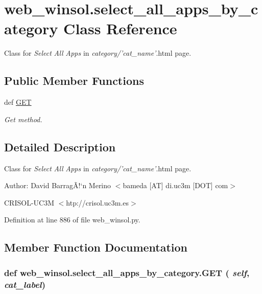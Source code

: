 \hypertarget{classweb__winsol_1_1select__all__apps__by__category}{
\section{web\_\-winsol.select\_\-all\_\-apps\_\-by\_\-category Class Reference}
\label{classweb__winsol_1_1select__all__apps__by__category}
}
Class for {\em Select\/} {\em All\/} {\em Apps\/} in {\em category/'cat\_\-name'\/}.html page.  


\subsection*{Public Member Functions}
\begin{CompactItemize}
\item 
def \hyperlink{classweb__winsol_1_1select__all__apps__by__category_27c6a7c9cacaacad2c5ce4ede8663be0}{GET}
\begin{CompactList}\small\item\em Get method. \item\end{CompactList}\end{CompactItemize}


\subsection{Detailed Description}
Class for {\em Select\/} {\em All\/} {\em Apps\/} in {\em category/'cat\_\-name'\/}.html page. 

\begin{Desc}
\item[Author:]David Barrag\~{A}!`n Merino $<$bameda \mbox{[}AT\mbox{]} di.uc3m \mbox{[}DOT\mbox{]} com$>$ 

CRISOL-UC3M $<$htp://crisol.uc3m.es$>$ \end{Desc}




Definition at line 886 of file web\_\-winsol.py.

\subsection{Member Function Documentation}
\hypertarget{classweb__winsol_1_1select__all__apps__by__category_27c6a7c9cacaacad2c5ce4ede8663be0}{
\subsubsection[GET]{\setlength{\rightskip}{0pt plus 5cm}def web\_\-winsol.select\_\-all\_\-apps\_\-by\_\-category.GET ( {\em self},  {\em cat\_\-label})}}
\label{classweb__winsol_1_1select__all__apps__by__category_27c6a7c9cacaacad2c5ce4ede8663be0}


